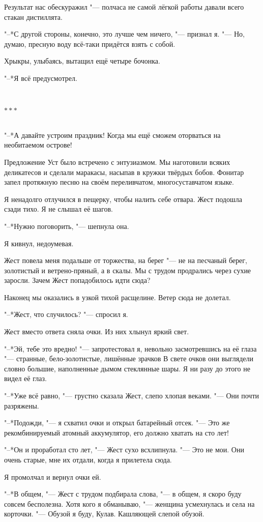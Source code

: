 \documentclass[a4paper,12pt,fleqn]{book}
\newcommand{\ldotst}{\so{...}\xspace}
\newcommand{\razd}{~\\{\centering\Large\bfseries$\ast \ast \ast$\par}~\\}
\begin{document}
Результат нас обескуражил "--- полчаса не самой лёгкой работы давали всего стакан дистиллята.

"--*С другой стороны, конечно, это лучше чем ничего, "--- признал я.
"--- Но, думаю, пресную воду всё-таки придётся взять с собой.

Хрыкры, улыбаясь, вытащил ещё четыре бочонка.

"--*Я всё предусмотрел.

\razd

"--*А давайте устроим праздник!
Когда мы ещё сможем оторваться на необитаемом острове!

Предложение Уст было встречено с энтузиазмом.
Мы наготовили всяких деликатесов и сделали маракасы, насыпав в кружки твёрдых бобов.
Фонитар запел протяжную песню на своём переливчатом, многосуставчатом языке.


Я ненадолго отлучился в пещерку, чтобы налить себе отвара.
Жест подошла сзади тихо.
Я не слышал её шагов.

"--*Нужно поговорить, "--- шепнула она.

Я кивнул, недоумевая.

Жест повела меня подальше от торжества, на берег "--- не на песчаный берег, золотистый и ветрено-пряный, а в скалы.
Мы с трудом продрались через сухие заросли.
Зачем Жест попадобилось идти сюда?

Наконец мы оказались в узкой тихой расщелине.
Ветер сюда не долетал.

"--*Жест, что случилось? "--- спросил я.

Жест вместо ответа сняла очки.
Из них хлынул яркий свет.

"--*Эй, тебе это вредно! "--- запротестовал я, невольно засмотревшись на её глаза "--- странные, бело-золотистые, лишённые зрачков\ldotst
В свете очков они выглядели словно большие, наполненные дымом стеклянные шары.
Я ни разу до этого не видел её глаз.

"--*Уже всё равно, "--- грустно сказала Жест, слепо хлопая веками.
"--- Они почти разряжены.

"--*Подожди, "--- я схватил очки и открыл батарейный отсек.
"--- Это же рекомбинируемый атомный аккумулятор, его должно хватать на сто лет!

"--*Он и проработал сто лет, "--- Жест сухо всхлипнула.
"--- Это не мои.
Они очень старые, мне их отдали, когда я прилетела сюда.

Я промолчал и вернул очки ей.

"--*В общем, "--- Жест с трудом подбирала слова, "--- в общем, я скоро буду совсем бесполезна.
Хотя кого я обманываю, "--- женщина усмехнулась и села на корточки.
"--- Обузой я буду, Кулав.
Кашляющей слепой обузой.
\end{document}
